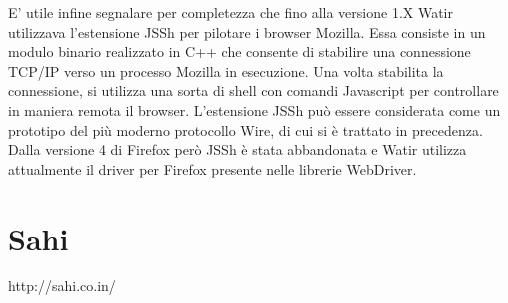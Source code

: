 E' utile infine segnalare per completezza che fino alla versione 1.X Watir utilizzava l'estensione JSSh per pilotare i browser Mozilla. Essa consiste in un modulo binario realizzato in C++ che consente di stabilire una connessione TCP/IP verso un processo Mozilla in esecuzione. Una volta stabilita la connessione, si utilizza una sorta di shell con comandi Javascript per controllare in maniera remota il browser. L'estensione JSSh può essere considerata come un prototipo del più moderno protocollo Wire, di cui si è trattato in precedenza. Dalla versione 4 di Firefox però JSSh è stata abbandonata e Watir utilizza attualmente il driver per Firefox presente nelle librerie WebDriver.






\section{Sahi}
http://sahi.co.in/
